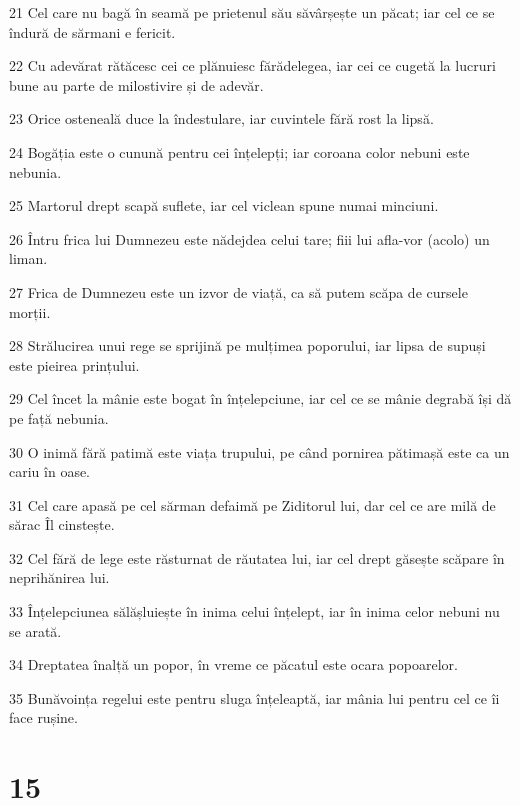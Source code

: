 \par 21 Cel care nu bagă în seamă pe prietenul său săvârșește un păcat; iar cel ce se îndură de sărmani e fericit.
\par 22 Cu adevărat rătăcesc cei ce plănuiesc fărădelegea, iar cei ce cugetă la lucruri bune au parte de milostivire și de adevăr.
\par 23 Orice osteneală duce la îndestulare, iar cuvintele fără rost la lipsă.
\par 24 Bogăția este o cunună pentru cei înțelepți; iar coroana color nebuni este nebunia.
\par 25 Martorul drept scapă suflete, iar cel viclean spune numai minciuni.
\par 26 Întru frica lui Dumnezeu este nădejdea celui tare; fiii lui afla-vor (acolo) un liman.
\par 27 Frica de Dumnezeu este un izvor de viață, ca să putem scăpa de cursele morții.
\par 28 Strălucirea unui rege se sprijină pe mulțimea poporului, iar lipsa de supuși este pieirea prințului.
\par 29 Cel încet la mânie este bogat în înțelepciune, iar cel ce se mânie degrabă își dă pe față nebunia.
\par 30 O inimă fără patimă este viața trupului, pe când pornirea pătimașă este ca un cariu în oase.
\par 31 Cel care apasă pe cel sărman defaimă pe Ziditorul lui, dar cel ce are milă de sărac Îl cinstește.
\par 32 Cel fără de lege este răsturnat de răutatea lui, iar cel drept găsește scăpare în neprihănirea lui.
\par 33 Înțelepciunea sălășluiește în inima celui înțelept, iar în inima celor nebuni nu se arată.
\par 34 Dreptatea înalță un popor, în vreme ce păcatul este ocara popoarelor.
\par 35 Bunăvoința regelui este pentru sluga înțeleaptă, iar mânia lui pentru cel ce îi face rușine.

\chapter{15}

